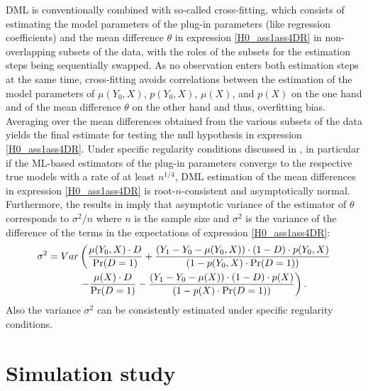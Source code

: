 {	DML is conventionally combined with so-called cross-fitting, which consists of estimating the model parameters of the plug-in parameters (like regression coefficients) and the mean difference $\theta$ in expression \eqref{H0_ass1ass4DR} in non-overlapping subsets of the data, with the roles of the subsets for the estimation steps being sequentially swapped. As no observation enters both estimation steps at the same time, cross-fitting avoids correlations between the estimation of the model parameters of $\mu(Y_0,X)$, $p(Y_0,X)$, $\mu(X)$, and $p(X)$ on the one hand and of the mean difference $\theta$  on the other hand and thus, overfitting bias. Averaging over the mean differences obtained from the various subsets of the data yields the final estimate for testing the null hypothesis in expression \eqref{H0_ass1ass4DR}. Under specific regularity conditions discussed in \cite{Chetal2018}, in particular if the ML-based estimators of the plug-in parameters converge to the respective true models with a rate of at least $n^{1/4}$, DML estimation of the mean differences in expression \eqref{H0_ass1ass4DR} is root-$n$-consistent and asymptotically normal. Furthermore, the results in \cite{Chetal2018} imply that asymptotic variance of the estimator of $\theta$ corresponds to $\sigma^2/n$ where $n$ is the sample size and $\sigma^2$ is the variance of the difference of the terms in the expectations of expression \eqref{H0_ass1ass4DR}:
	\begin{align} \label{varscore}
		\sigma^2=Var& \left(\frac{\mu(Y_0,X)\cdot D}{\Pr(D=1)}+\frac{(Y_1-Y_0-\mu(Y_0,X))\cdot (1-D)\cdot p(Y_0,X)}{(1-p(Y_0,X)\cdot \Pr(D=1))}\right.\\
		&\left.-\frac{\mu(X)\cdot D}{\Pr(D=1)}-\frac{(Y_1-Y_0-\mu(X))\cdot (1-D)\cdot p(X)}{(1-p(X)\cdot \Pr(D=1))}\right).\notag
	\end{align} 
 Also the variance $\sigma^2$ can be consistently estimated under specific regularity conditions. 
	
	\section{Simulation study}\label{simulation}
	
}
